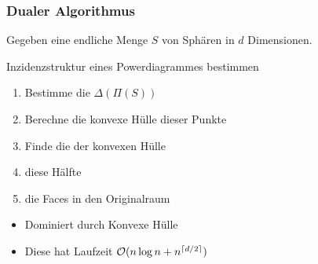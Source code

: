
\begin{frame}
    \frametitle{Dualer Algorithmus}

    Gegeben eine endliche Menge $S$ von Sphären in $d$ Dimensionen.

    \vfill

    \begin{block}{Inzidenzstruktur eines Powerdiagrammes bestimmen}
        \begin{enumerate}
            \item Bestimme die  $\Delta(\Pi(S))$
            \item Berechne die \alert{konvexe Hülle} dieser Punkte
            \item Finde die  der konvexen Hülle
            \item {} diese Hälfte
            \item {} die Faces in den Originalraum
        \end{enumerate}
    \end{block}

    \vfill

    \begin{itemize}
        \item Dominiert durch Konvexe Hülle
        \item Diese hat Laufzeit $\mathcal{O}(n \log n + n^{\left\lceil d/2\right\rceil})$
    \end{itemize}
\end{frame}


